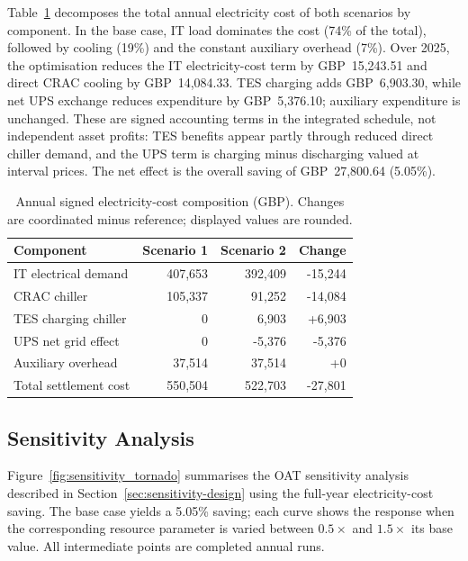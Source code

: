 \documentclass[lettersize,journal]{IEEEtran}
\newcommand{\rev}[1]{#1}
\begin{document}
\rev{Table~\ref{tab:cost-breakdown} decomposes the total annual electricity cost of both scenarios by component. In the base case, IT load dominates the cost (74\% of the total), followed by cooling (19\%) and the constant auxiliary overhead (7\%). Over 2025, the optimisation reduces the IT electricity-cost term by GBP~15,243.51 and direct CRAC cooling by GBP~14,084.33. TES charging adds GBP~6,903.30, while net UPS exchange reduces expenditure by GBP~5,376.10; auxiliary expenditure is unchanged. These are signed accounting terms in the integrated schedule, not independent asset profits: TES benefits appear partly through reduced direct chiller demand, and the UPS term is charging minus discharging valued at interval prices. The net effect is the overall saving of GBP~27,800.64 (5.05\%).}

\begin{table}[htbp]
\centering\small
\caption{Annual signed electricity-cost composition (GBP). Changes are coordinated minus reference; displayed values are rounded.}\label{tab:cost-breakdown}
\begin{tabular}{@{}lrrr@{}}\toprule
Component & Scenario 1 & Scenario 2 & Change \\\midrule
IT electrical demand & 407,653 & 392,409 & -15,244 \\
CRAC chiller & 105,337 & 91,252 & -14,084 \\
TES charging chiller & 0 & 6,903 & +6,903 \\
UPS net grid effect & 0 & -5,376 & -5,376 \\
Auxiliary overhead & 37,514 & 37,514 & +0 \\
Total settlement cost & 550,504 & 522,703 & -27,801 \\
\bottomrule\end{tabular}
\end{table}

\subsection{\rev{Sensitivity Analysis}}\label{sec:sensitivity}
\rev{Figure~\ref{fig:sensitivity_tornado} summarises the OAT sensitivity analysis described in Section~\ref{sec:sensitivity-design} using the full-year electricity-cost saving. The base case yields a 5.05\% saving; each curve shows the response when the corresponding resource parameter is varied between $0.5\times$ and $1.5\times$ its base value. All intermediate points are completed annual runs.}
\end{document}

